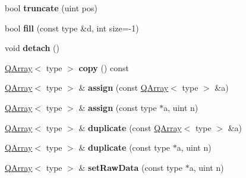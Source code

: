 \begin{DoxyCompactItemize}
\item 
\hypertarget{class_q_array_a1546e903bdbf7b496b4f8b05a5ff908d}{bool {\bfseries truncate} (uint pos)}\label{class_q_array_a1546e903bdbf7b496b4f8b05a5ff908d}

\item 
\hypertarget{class_q_array_a4e473e12ea399d33ee6a77a40c9fe69f}{bool {\bfseries fill} (const type \&d, int size=-\/1)}\label{class_q_array_a4e473e12ea399d33ee6a77a40c9fe69f}

\item 
\hypertarget{class_q_array_ac295bade8aee589f6718dfa79edc2a34}{void {\bfseries detach} ()}\label{class_q_array_ac295bade8aee589f6718dfa79edc2a34}

\item 
\hypertarget{class_q_array_a8cd54937f2972b66250e8004f028c6d9}{\hyperlink{class_q_array}{Q\-Array}$<$ type $>$ {\bfseries copy} () const }\label{class_q_array_a8cd54937f2972b66250e8004f028c6d9}

\item 
\hypertarget{class_q_array_a933191047b0d1b032427eb880d929e8f}{\hyperlink{class_q_array}{Q\-Array}$<$ type $>$ \& {\bfseries assign} (const \hyperlink{class_q_array}{Q\-Array}$<$ type $>$ \&a)}\label{class_q_array_a933191047b0d1b032427eb880d929e8f}

\item 
\hypertarget{class_q_array_a72135016e3688d1d32c490fe2c2420d7}{\hyperlink{class_q_array}{Q\-Array}$<$ type $>$ \& {\bfseries assign} (const type $\ast$a, uint n)}\label{class_q_array_a72135016e3688d1d32c490fe2c2420d7}

\item 
\hypertarget{class_q_array_ab82f93491f3cf01cff9c5f808c0be50a}{\hyperlink{class_q_array}{Q\-Array}$<$ type $>$ \& {\bfseries duplicate} (const \hyperlink{class_q_array}{Q\-Array}$<$ type $>$ \&a)}\label{class_q_array_ab82f93491f3cf01cff9c5f808c0be50a}

\item 
\hypertarget{class_q_array_aa2f9f42548aaadd4c56e028416d22909}{\hyperlink{class_q_array}{Q\-Array}$<$ type $>$ \& {\bfseries duplicate} (const type $\ast$a, uint n)}\label{class_q_array_aa2f9f42548aaadd4c56e028416d22909}

\item 
\hypertarget{class_q_array_a2dbb9fa221dc2cfc8a67e4911e73ff0d}{\hyperlink{class_q_array}{Q\-Array}$<$ type $>$ \& {\bfseries set\-Raw\-Data} (const type $\ast$a, uint n)}\label{class_q_array_a2dbb9fa221dc2cfc8a67e4911e73ff0d}


\end{DoxyCompactItemize}
